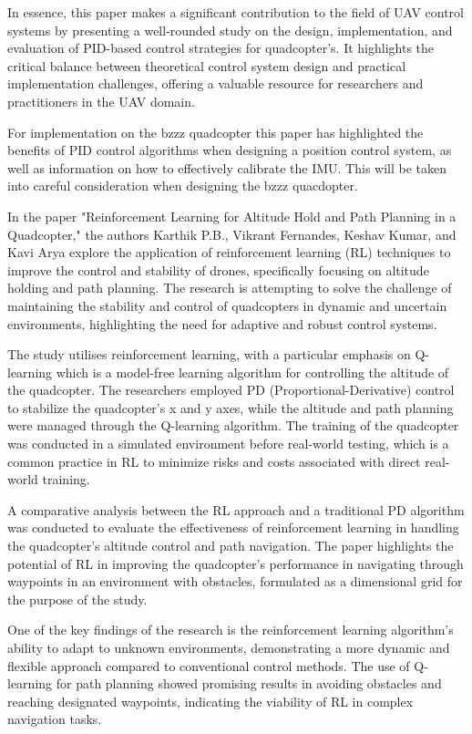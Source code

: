 \documentclass{article}
\begin{document}
In essence, this paper makes a significant contribution to the field of UAV
control systems by presenting a well-rounded study on the design,
implementation, and evaluation of PID-based control strategies for quadcopter's.
It highlights the critical balance between theoretical control system design and
practical implementation challenges, offering a valuable resource for
researchers and practitioners in the UAV domain.

For implementation on the bzzz quadcopter this paper has highlighted the
benefits of PID control algorithms when designing a position control system, as
well as information on how to effectively calibrate the IMU. This will be taken
into careful consideration when designing the bzzz quacdopter.

In the paper \cite{ReinforcementLearning} "Reinforcement Learning for Altitude
Hold and Path Planning in a Quadcopter," the authors Karthik P.B., Vikrant
Fernandes, Keshav Kumar, and Kavi Arya explore the application of reinforcement
learning (RL) techniques to improve the control and stability of drones,
specifically focusing on altitude holding and path planning. The research is
attempting to solve the challenge of maintaining the stability and control of
quadcopters in dynamic and uncertain environments, highlighting the need for
adaptive and robust control systems.

The study utilises reinforcement learning, with a particular emphasis on
Q-learning which is a model-free learning algorithm for controlling the altitude
of the quadcopter. The researchers employed PD (Proportional-Derivative) control
to stabilize the quadcopter's x and y axes, while the altitude and path planning
were managed through the Q-learning algorithm. The training of the quadcopter
was conducted in a simulated environment before real-world testing, which is a
common practice in RL to minimize risks and costs associated with direct
real-world training.

A comparative analysis between the RL approach and a traditional PD algorithm
was conducted to evaluate the effectiveness of reinforcement learning in
handling the quadcopter's altitude control and path navigation. The paper
highlights the potential of RL in improving the quadcopter's performance in
navigating through waypoints in an environment with obstacles, formulated as a
dimensional grid for the purpose of the study.

One of the key findings of the research is the reinforcement learning
algorithm's ability to adapt to unknown environments, demonstrating a more
dynamic and flexible approach compared to conventional control methods. The use
of Q-learning for path planning showed promising results in avoiding obstacles
and reaching designated waypoints, indicating the viability of RL in complex
navigation tasks.
\end{document}
